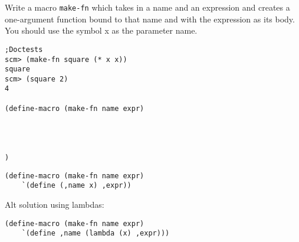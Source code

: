 \begin{blocksection}

\question Write a macro \texttt{make-fn} which takes in a name and an expression and creates
a one-argument function bound to that name and with the expression as its body. You should use
the symbol x as the parameter name.

\begin{lstlisting}
;Doctests
scm> (make-fn square (* x x))
square
scm> (square 2)
4

(define-macro (make-fn name expr)




)

\end{lstlisting}
\end{blocksection}
\begin{blocksection}
\begin{solution}[0in]
\begin{lstlisting}
(define-macro (make-fn name expr)
    `(define (,name x) ,expr))
\end{lstlisting}
Alt solution using lambdas:
\begin{lstlisting}
(define-macro (make-fn name expr)
    `(define ,name (lambda (x) ,expr)))
\end{lstlisting}
\end{solution}

\end{blocksection}
